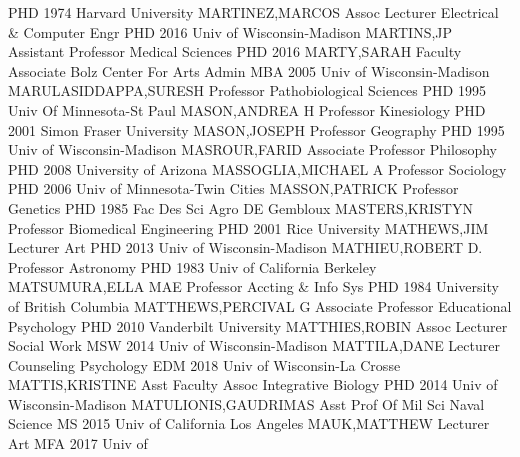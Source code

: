 \documentclass[
]{article}
\begin{document}
\textbar PHD 1974 Harvard University \textbar MARTINEZ,MARCOS \textbar{}
 \textbar Assoc Lecturer \textbar Electrical \& Computer
Engr \textbar PHD 2016 Univ of Wisconsin-Madison \textbar MARTINS,JP
\textbar{}  \textbar Assistant Professor \textbar Medical
Sciences \textbar PHD 2016 \textbar MARTY,SARAH \textbar{} 
\textbar Faculty Associate \textbar Bolz Center For Arts Admin
\textbar MBA 2005 Univ of Wisconsin-Madison
\textbar MARULASIDDAPPA,SURESH \textbar{} 
\textbar Professor \textbar Pathobiological Sciences \textbar PHD 1995
Univ Of Minnesota-St Paul \textbar MASON,ANDREA H \textbar{}
 \textbar Professor \textbar Kinesiology \textbar PHD 2001
Simon Fraser University \textbar MASON,JOSEPH \textbar{} 
\textbar Professor \textbar Geography \textbar PHD 1995 Univ of
Wisconsin-Madison \textbar MASROUR,FARID \textbar{} 
\textbar Associate Professor \textbar Philosophy \textbar PHD 2008
University of Arizona \textbar MASSOGLIA,MICHAEL A \textbar{}
 \textbar Professor \textbar Sociology \textbar PHD 2006
Univ of Minnesota-Twin Cities \textbar MASSON,PATRICK \textbar{}
 \textbar Professor \textbar Genetics \textbar PHD 1985 Fac
Des Sci Agro DE Gembloux \textbar MASTERS,KRISTYN \textbar{}
 \textbar Professor \textbar Biomedical Engineering
\textbar PHD 2001 Rice University \textbar MATHEWS,JIM \textbar{}
 \textbar Lecturer \textbar Art \textbar PHD 2013 Univ of
Wisconsin-Madison \textbar MATHIEU,ROBERT D. \textbar{} 
\textbar Professor \textbar Astronomy \textbar PHD 1983 Univ of
California Berkeley \textbar MATSUMURA,ELLA MAE \textbar{} 
\textbar Professor \textbar Accting \& Info Sys \textbar PHD 1984
University of British Columbia \textbar MATTHEWS,PERCIVAL G \textbar{}
 \textbar Associate Professor \textbar Educational
Psychology \textbar PHD 2010 Vanderbilt University
\textbar MATTHIES,ROBIN \textbar{}  \textbar Assoc Lecturer
\textbar Social Work \textbar MSW 2014 Univ of Wisconsin-Madison
\textbar MATTILA,DANE \textbar{}  \textbar Lecturer
\textbar Counseling Psychology \textbar EDM 2018 Univ of Wisconsin-La
Crosse \textbar MATTIS,KRISTINE \textbar{}  \textbar Asst
Faculty Assoc \textbar Integrative Biology \textbar PHD 2014 Univ of
Wisconsin-Madison \textbar MATULIONIS,GAUDRIMAS \textbar{} 
\textbar Asst Prof Of Mil Sci \textbar Naval Science \textbar MS 2015
Univ of California Los Angeles \textbar MAUK,MATTHEW \textbar{}
 \textbar Lecturer \textbar Art \textbar MFA 2017 Univ of
\end{document}
